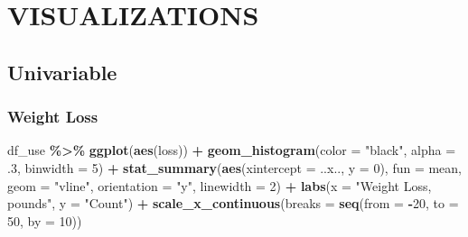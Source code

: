 \documentclass[
]{article}
\newenvironment{Shaded}{\begin{snugshade}}{\end{snugshade}}
\newcommand{\AttributeTok}[1]{\textcolor[rgb]{0.13,0.29,0.53}{#1}}
\newcommand{\DecValTok}[1]{\textcolor[rgb]{0.00,0.00,0.81}{#1}}
\newcommand{\FunctionTok}[1]{\textcolor[rgb]{0.13,0.29,0.53}{\textbf{#1}}}
\newcommand{\NormalTok}[1]{#1}
\newcommand{\SpecialCharTok}[1]{\textcolor[rgb]{0.81,0.36,0.00}{\textbf{#1}}}
\newcommand{\StringTok}[1]{\textcolor[rgb]{0.31,0.60,0.02}{#1}}
\begin{document}
\clearpage

\hypertarget{visualizations}{%
\section{VISUALIZATIONS}\label{visualizations}}

\hypertarget{univariable}{%
\subsection{Univariable}\label{univariable}}

\hypertarget{weight-loss}{%
\subsubsection{Weight Loss}\label{weight-loss}}

\begin{Shaded}
\begin{Highlighting}[]
\NormalTok{df\_use }\SpecialCharTok{\%\textgreater{}\%} 
  \FunctionTok{ggplot}\NormalTok{(}\FunctionTok{aes}\NormalTok{(loss)) }\SpecialCharTok{+} 
  \FunctionTok{geom\_histogram}\NormalTok{(}\AttributeTok{color =} \StringTok{"black"}\NormalTok{,}
                 \AttributeTok{alpha =}\NormalTok{ .}\DecValTok{3}\NormalTok{,}
                 \AttributeTok{binwidth =} \DecValTok{5}\NormalTok{) }\SpecialCharTok{+}
  \FunctionTok{stat\_summary}\NormalTok{(}\FunctionTok{aes}\NormalTok{(}\AttributeTok{xintercept =}\NormalTok{ ..x.., }
                   \AttributeTok{y =} \DecValTok{0}\NormalTok{), }
               \AttributeTok{fun =}\NormalTok{ mean, }
               \AttributeTok{geom =} \StringTok{"vline"}\NormalTok{, }
               \AttributeTok{orientation =} \StringTok{"y"}\NormalTok{,}
               \AttributeTok{linewidth =} \DecValTok{2}\NormalTok{) }\SpecialCharTok{+}
  \FunctionTok{labs}\NormalTok{(}\AttributeTok{x =} \StringTok{"Weight Loss, pounds"}\NormalTok{,}
       \AttributeTok{y =} \StringTok{"Count"}\NormalTok{) }\SpecialCharTok{+}
  \FunctionTok{scale\_x\_continuous}\NormalTok{(}\AttributeTok{breaks =} \FunctionTok{seq}\NormalTok{(}\AttributeTok{from =} \SpecialCharTok{{-}}\DecValTok{20}\NormalTok{, }\AttributeTok{to =} \DecValTok{50}\NormalTok{, }\AttributeTok{by =} \DecValTok{10}\NormalTok{)) }
\end{Highlighting}
\end{Shaded}
\end{document}
